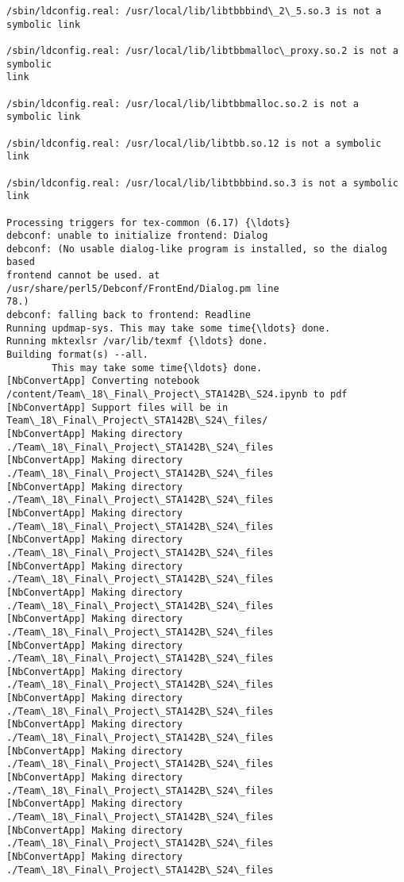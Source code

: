 \documentclass[11pt]{article}
\begin{document}
\begin{Verbatim}[commandchars=\\\{\}]
/sbin/ldconfig.real: /usr/local/lib/libtbbbind\_2\_5.so.3 is not a symbolic link

/sbin/ldconfig.real: /usr/local/lib/libtbbmalloc\_proxy.so.2 is not a symbolic
link

/sbin/ldconfig.real: /usr/local/lib/libtbbmalloc.so.2 is not a symbolic link

/sbin/ldconfig.real: /usr/local/lib/libtbb.so.12 is not a symbolic link

/sbin/ldconfig.real: /usr/local/lib/libtbbbind.so.3 is not a symbolic link

Processing triggers for tex-common (6.17) {\ldots}
debconf: unable to initialize frontend: Dialog
debconf: (No usable dialog-like program is installed, so the dialog based
frontend cannot be used. at /usr/share/perl5/Debconf/FrontEnd/Dialog.pm line
78.)
debconf: falling back to frontend: Readline
Running updmap-sys. This may take some time{\ldots} done.
Running mktexlsr /var/lib/texmf {\ldots} done.
Building format(s) --all.
        This may take some time{\ldots} done.
[NbConvertApp] Converting notebook
/content/Team\_18\_Final\_Project\_STA142B\_S24.ipynb to pdf
[NbConvertApp] Support files will be in Team\_18\_Final\_Project\_STA142B\_S24\_files/
[NbConvertApp] Making directory ./Team\_18\_Final\_Project\_STA142B\_S24\_files
[NbConvertApp] Making directory ./Team\_18\_Final\_Project\_STA142B\_S24\_files
[NbConvertApp] Making directory ./Team\_18\_Final\_Project\_STA142B\_S24\_files
[NbConvertApp] Making directory ./Team\_18\_Final\_Project\_STA142B\_S24\_files
[NbConvertApp] Making directory ./Team\_18\_Final\_Project\_STA142B\_S24\_files
[NbConvertApp] Making directory ./Team\_18\_Final\_Project\_STA142B\_S24\_files
[NbConvertApp] Making directory ./Team\_18\_Final\_Project\_STA142B\_S24\_files
[NbConvertApp] Making directory ./Team\_18\_Final\_Project\_STA142B\_S24\_files
[NbConvertApp] Making directory ./Team\_18\_Final\_Project\_STA142B\_S24\_files
[NbConvertApp] Making directory ./Team\_18\_Final\_Project\_STA142B\_S24\_files
[NbConvertApp] Making directory ./Team\_18\_Final\_Project\_STA142B\_S24\_files
[NbConvertApp] Making directory ./Team\_18\_Final\_Project\_STA142B\_S24\_files
[NbConvertApp] Making directory ./Team\_18\_Final\_Project\_STA142B\_S24\_files
[NbConvertApp] Making directory ./Team\_18\_Final\_Project\_STA142B\_S24\_files
[NbConvertApp] Making directory ./Team\_18\_Final\_Project\_STA142B\_S24\_files
[NbConvertApp] Making directory ./Team\_18\_Final\_Project\_STA142B\_S24\_files
[NbConvertApp] Making directory ./Team\_18\_Final\_Project\_STA142B\_S24\_files

\end{Verbatim}
\end{document}
